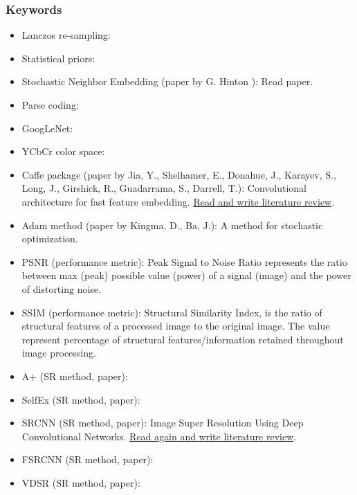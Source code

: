 \documentclass[11pt]{article}
\begin{document}
\subsubsection{Keywords}
\begin{itemize}
	
	\item Lanczos re-sampling:
	
	\item Statistical priors:
	
	\item Stochastic Neighbor Embedding (paper by G. Hinton \cite{SNE}): Read paper.
	
	\item Parse coding:
	
	\item GoogLeNet:
	
	\item YCbCr color space: 
	
	\item Caffe package (paper by Jia, Y., Shelhamer, E., Donahue, J., Karayev, S., Long, J., Girshick, R., Guadarrama, S., Darrell, T.): Convolutional architecture for fast feature embedding. \underline{Read and write literature review}.  
	
	\item Adam method (paper by Kingma, D., Ba, J.): A method for stochastic optimization. 
	
	\item PSNR (performance metric): Peak Signal to Noise Ratio represents the ratio between max (peak) possible value (power) of a signal (image) and the power of distorting noise.  
	
	\item SSIM (performance metric): Structural Similarity Index, is the ratio of structural features of a processed image to the original image. The value represent percentage of structural features/information retained throughout image processing.  
	
	\item A+ (SR method, paper):
	
	\item SelfEx (SR method, paper):
	
	\item SRCNN (SR method, paper): Image Super Resolution Using Deep Convolutional Networks. \underline{Read again and write literature review}.  
	
	\item FSRCNN (SR method, paper):
	
	\item VDSR (SR method, paper):
	
\end{itemize} 
\end{document}
